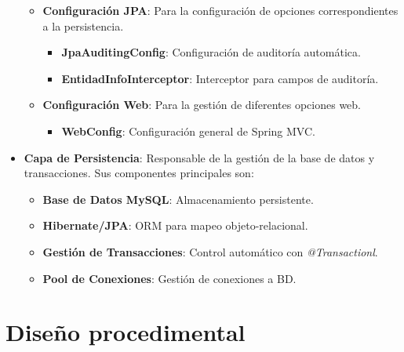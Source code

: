 \begin{itemize}
\begin{itemize}
            \item \textbf{Configuración JPA}: Para la configuración de opciones correspondientes a la persistencia.
        	\begin{itemize}
                \item \textbf{JpaAuditingConfig}: Configuración de auditoría automática.
                \item \textbf{EntidadInfoInterceptor}: Interceptor para campos de auditoría.
            \end{itemize}

            \item \textbf{Configuración Web}: Para la gestión de diferentes opciones web.
        	\begin{itemize}
                \item \textbf{WebConfig}: Configuración general de Spring MVC.
             \end{itemize}
         \end{itemize}

	\item \textbf{Capa de Persistencia}: Responsable de la gestión de la base de datos y transacciones. Sus componentes principales son:
    	\begin{itemize}
            \item \textbf{Base de Datos MySQL}: Almacenamiento persistente.
            \item \textbf{Hibernate/JPA}: ORM para mapeo objeto-relacional.
            \item \textbf{Gestión de Transacciones}: Control automático con \emph{@Transactionl}.
            \item \textbf{Pool de Conexiones}: Gestión de conexiones a BD.
         \end{itemize}
\end{itemize}



\newpage

\section{Diseño procedimental}



